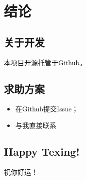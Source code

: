 \chapter{结论}
\section{关于开发}
本项目开源托管于Github。
\section{求助方案}
\begin{itemize}
	\item 在Github提交Issue；
	\item 与我直接联系
\end{itemize}
\section{Happy Texing!}
祝你好运！